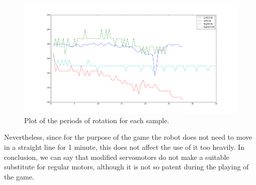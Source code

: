 \documentclass[a4paper,twoside]{book}
\begin{document}
\begin{figure}[h]
\includegraphics[width=\paperwidth, center]{img/figure_1}
\caption{Plot of the periods of rotation for each sample.}
\label{fig:rpmtime}
\end{figure}

Nevertheless, since for the purpose of the game the robot does not need to move in a straight line for 1 minute, this does not affect the use of it too heavily. 
In conclusion, we can say that modified servomotors do not make a suitable substitute for regular motors, although it is not so patent during the playing of the game.
\end{document}

